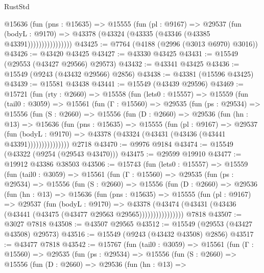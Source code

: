 \begin{lexlean}{RustStd}
\begin{coremodule}
                    @15636
                      (fun (pns : @15635) =>
                      @15555
                        (fun (pl : @9167) =>
                        @29537
                          (fun (bodyL : @9170) =>
                          @43378 (@43324 (@43335 (@43346 (@43385 @43391))))))))))))))))
@43425 := @7764 (@4188 (@2996 (@3013 @6970) @3016))
@43426 := @43420 @43425
@43427 := @43330 @43425
@43431 := @15549 (@29553 (@43427 @29566) @29573)
@43432 := @43341 @43425
@43436 := @15549 (@9243 (@43432 @29566) @2856)
@43438 := @43381 (@15596 @43425)
@43439 := @15581 @43438
@43441 := @15549 (@43439 @29596)
@43469 := @15721
    (fun (rty : @2660) =>
    @15558
      (fun (lets0 : @15557) =>
      @15559
        (fun (tail0 : @3059) =>
        @15561
          (fun (Γ : @15560) =>
          @29535
            (fun (ps : @29534) =>
            @15556
              (fun (S : @2660) =>
              @15556
                (fun (D : @2660) =>
                @29536
                  (fun (hn : @13) =>
                  @15636
                    (fun (pns : @15635) =>
                    @15555
                      (fun (pl : @9167) =>
                      @29537
                        (fun (bodyL : @9170) =>
                        @43378 (@43324 (@43431 (@43436 (@43441 @43391)))))))))))))))
    @2718
@43470 := @9976 @9184
@43474 := @15549 (@43322 (@9254 (@29543 @43470)))
@43475 := @29599 @19910
@43477 := @19912 @43386 @38503
@43506 := @15743
    (fun (lets0 : @15557) =>
    @15559
      (fun (tail0 : @3059) =>
      @15561
        (fun (Γ : @15560) =>
        @29535
          (fun (ps : @29534) =>
          @15556
            (fun (S : @2660) =>
            @15556
              (fun (D : @2660) =>
              @29536
                (fun (hn : @13) =>
                @15636
                  (fun (pns : @15635) =>
                  @15555
                    (fun (pl : @9167) =>
                    @29537
                      (fun (bodyL : @9170) =>
                      @43378
                        (@43474
                          (@43431 (@43436 (@43441 (@43475 (@43477 @29563 @29565))))))))))))))))
    @7818
@43507 := @3027 @7818
@43508 := @43507 @29565
@43512 := @15549 (@29553 (@43427 @43508) @29573)
@43516 := @15549 (@9243 (@43432 @43508) @2856)
@43517 := @43477 @7818
@43542 := @15767
    (fun (tail0 : @3059) =>
    @15561
      (fun (Γ : @15560) =>
      @29535
        (fun (ps : @29534) =>
        @15556
          (fun (S : @2660) =>
          @15556
            (fun (D : @2660) =>
            @29536
              (fun (hn : @13) =>

\end{coremodule}
\end{lexlean}
